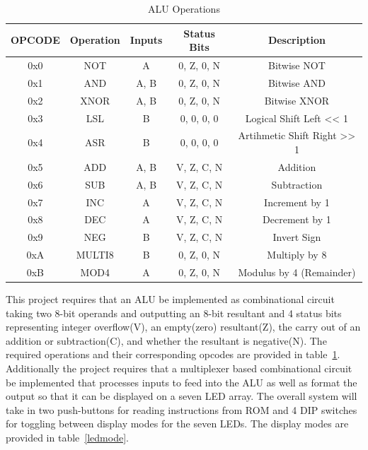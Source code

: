 \documentclass[12pt,letterpaper,titlepage]{article}
\begin{document}
\begin{raggedright}
\begin{table}
\centering
\begin{tabular}{|c||c|c|c|c|}\hline
OPCODE & Operation & Inputs & Status Bits & Description                 \\\hline\hline
0x0    & NOT       & A      & 0, Z, 0, N  & Bitwise NOT                 \\\hline
0x1    & AND       & A, B   & 0, Z, 0, N  & Bitwise AND                 \\\hline
0x2    & XNOR      & A, B   & 0, Z, 0, N  & Bitwise XNOR                \\\hline
0x3    & LSL       & B      & 0, 0, 0, 0  & Logical Shift Left << 1     \\\hline
0x4    & ASR       & B      & 0, 0, 0, 0  & Artihmetic Shift Right >> 1 \\\hline
0x5    & ADD       & A, B   & V, Z, C, N  & Addition                    \\\hline
0x6    & SUB       & A, B   & V, Z, C, N  & Subtraction                 \\\hline
0x7    & INC       & A      & V, Z, C, N  & Increment by 1              \\\hline
0x8    & DEC       & A      & V, Z, C, N  & Decrement by 1              \\\hline
0x9    & NEG       & B      & V, Z, C, N  & Invert Sign                 \\\hline
0xA    & MULTI8    & B      & 0, Z, 0, N  & Multiply by 8               \\\hline
0xB    & MOD4      & A      & 0, Z, 0, N  & Modulus by 4 (Remainder)    \\\hline
\end{tabular}
\caption{ALU Operations}\label{opcode}
\end{table}

This project requires that an ALU be implemented as combinational circuit taking two 8-bit operands and outputting an 8-bit resultant and 4 status bits representing integer overflow(V), an empty(zero) resultant(Z), the carry out of an addition or subtraction(C), and whether the resultant is negative(N). The required operations and their corresponding opcodes are provided in table~\ref{opcode}. Additionally the project requires that a multiplexer based combinational circuit be implemented that processes inputs to feed into the ALU as well as format the output so that it can be displayed on a seven LED array.
The overall system will take in two push-buttons for reading instructions from ROM and 4 DIP switches for toggling between display modes for the seven LEDs. The display modes are provided in table~\ref{ledmode}.


\end{raggedright}
\end{document}
